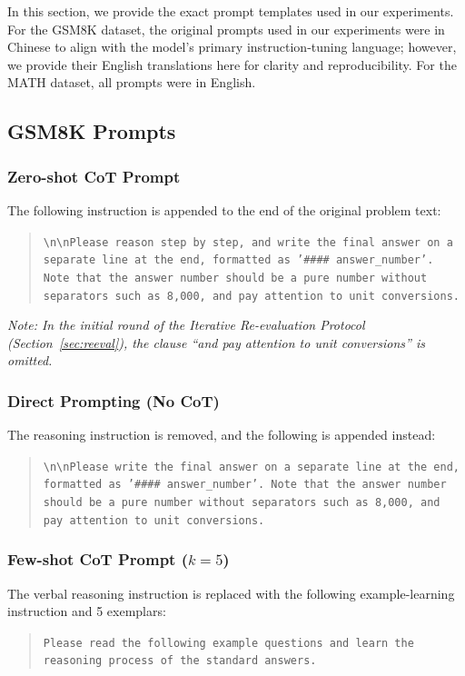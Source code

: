 \documentclass{article}
\begin{document}
In this section, we provide the exact prompt templates used in our experiments. For the GSM8K dataset, the original prompts used in our experiments were in Chinese to align with the model's primary instruction-tuning language; however, we provide their English translations here for clarity and reproducibility. For the MATH dataset, all prompts were in English.

\subsection{GSM8K Prompts}

\subsubsection{Zero-shot CoT Prompt}
The following instruction is appended to the end of the original problem text:
\begin{quote}
\small
\texttt{\textbackslash n\textbackslash nPlease reason step by step, and write the final answer on a separate line at the end, formatted as '\#\#\#\# answer\_number'. Note that the answer number should be a pure number without separators such as 8,000, and pay attention to unit conversions.}
\end{quote}
\textit{Note: In the initial round of the Iterative Re-evaluation Protocol (Section~\ref{sec:reeval}), the clause ``and pay attention to unit conversions'' is omitted.}

\subsubsection{Direct Prompting (No CoT)}
The reasoning instruction is removed, and the following is appended instead:
\begin{quote}
\small
\texttt{\textbackslash n\textbackslash nPlease write the final answer on a separate line at the end, formatted as '\#\#\#\# answer\_number'. Note that the answer number should be a pure number without separators such as 8,000, and pay attention to unit conversions.}
\end{quote}

\subsubsection{Few-shot CoT Prompt ($k=5$)}
The verbal reasoning instruction is replaced with the following example-learning instruction and 5 exemplars:
\begin{quote}
\small
\texttt{Please read the following example questions and learn the reasoning process of the standard answers.}
\end{quote}
\end{document}
